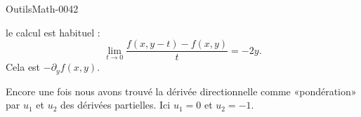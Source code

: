 
\begin{corrige}{OutilsMath-0042}

    le calcul est habituel :
    \begin{equation}
        \lim_{t\to 0} \frac{ f(x,y-t)-f(x,y) }{ t }=-2y.
    \end{equation}
    Cela est $-\partial_yf(x,y)$.

    Encore une fois nous avons trouvé la dérivée directionnelle comme «pondération» par $u_1$ et $u_2$ des dérivées partielles. Ici $u_1=0$ et $u_2=-1$.

\end{corrige}

